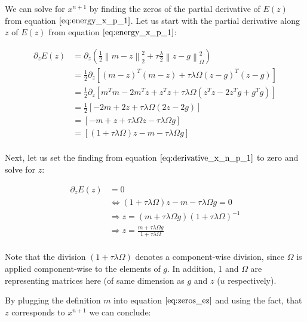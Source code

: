 \documentclass{paper}
\newcommand{\twonorm}[1]{\left\lVert#1\right\rVert_2}
\newcommand{\norm}[1]{\left\lVert#1\right\rVert}
\begin{document}
We can solve for $x^{n+1}$ by finding the zeros of the partial derivative of $E(z)$ from equation $\ref{eq:energy_x_p_1}$. Let us start with the partial derivative along $z$ of $E(z)$ from equation $\ref{eq:energy_x_p_1}$: 

\begin{align}
	\partial_{z} E(z)
	&= \partial_{z} \left( \frac{1}{2} \twonorm{m - z}^2 + \tau \frac{\lambda}{2}\norm{z - g}_{\Omega}^2 \right) \nonumber \\
	&= \frac{1}{2} \partial_{z} \left[ \left( m - z \right)^{T}\left( m - z \right) + \tau \lambda \Omega \left( z -g \right)^{T}\left( z -g \right) \right] \nonumber \\
	&= \frac{1}{2} \partial_{z} \left[ m^{T}m -2m^{T} z + z^{T} z + \tau \lambda \Omega \left( z^{T}z -2z^{T} g + g^{T} g\right) \right] \nonumber \\
	&= \frac{1}{2} \left[ -2m + 2z + \tau \lambda \Omega \left( 2 z -2g \right) \right] \nonumber \\
	&= \left[ -m + z + \tau \lambda \Omega z - \tau \lambda \Omega g \right]	 \nonumber \\	
	&= \left[ \left(1+\tau \lambda \Omega \right)z-m - \tau \lambda \Omega g \right]	 \nonumber \\
\label{eq:derivative_x_n_p_1}		
\end{align}

Next, let us set the finding from equation $\ref{eq:derivative_x_n_p_1}$ to zero and solve for $z$:

\begin{align}
	\partial_{z} E(z) 
	&= 0 \nonumber \\
	&\Leftrightarrow \left(1+\tau \lambda \Omega \right)z-m - \tau \lambda \Omega g = 0 \nonumber \\
	&\Rightarrow z = \left(m +  \tau \lambda \Omega g \right) \left( 1+\tau \lambda \Omega\right)^{-1} \nonumber \\
	&\Rightarrow z = \frac{m +  \tau \lambda \Omega g}{1+\tau \lambda \Omega} \nonumber \\
\label{eq:zeros_ez}	
\end{align}

Note that the division $(1+\tau \lambda \Omega)$ denotes a component-wise division, since $\Omega$ is applied component-wise to the elements of $g$. In addition, 1 and $\Omega$ are representing matrices here (of same dimension as $g$ and $z$ ($u$ respectively).

By plugging the definition $m$ into equation $\ref{eq:zeros_ez}$ and using the fact, that $z$ corresponds to $x^{n+1}$ we can conclude:
\end{document}
